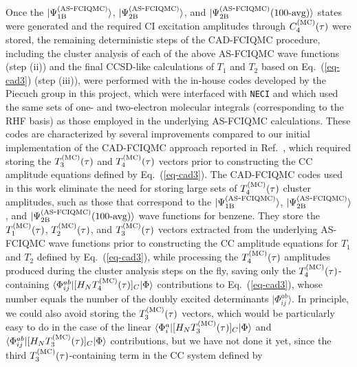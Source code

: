 \documentclass[journal=jcp,manuscript=suppinfo]{achemso}
\begin{document}
Once the $|\Psi_{\rm 1B}^{\rm (AS\mbox{-}FCIQMC)}\rangle$, $|\Psi_{\rm 2B}^{\rm (AS\mbox{-}FCIQMC)}\rangle$,
and $|\Psi_{\rm 2B}^{\rm (AS\mbox{-}FCIQMC)}\mbox{(100-avg)}\rangle$ states were generated and the
required CI excitation amplitudes through $C_{4}^{\rm (MC)}(\tau)$ were stored, the remaining
deterministic steps of the CAD-FCIQMC procedure, including the cluster analysis of each of the above
AS-FCIQMC wave functions (step (ii)) and the final CCSD-like calculations of $T_{1}$ and $T_{2}$ based on
Eq.\ (\ref{eq-cad3}) (step (iii)), were performed with the in-house codes developed by the Piecuch group in
this project, which were interfaced with {\texttt{NECI}} and which used the same sets of one- and two-electron
molecular integrals (corresponding to the RHF basis) as those employed in the underlying AS-FCIQMC calculations.
These codes are characterized by several improvements compared to our initial implementation of the CAD-FCIQMC
approach reported in Ref.\ , which required storing the
$T_{3}^{\rm (MC)}(\tau)$ and $T_{4}^{\rm (MC)}(\tau)$ vectors prior to constructing the CC amplitude
equations defined by Eq.\ (\ref{eq-cad3}). The CAD-FCIQMC codes used in this work eliminate the need for
storing large sets of $T_{4}^{\rm (MC)}(\tau)$ cluster amplitudes, such as those that correspond
to the $|\Psi_{\rm 1B}^{\rm (AS\mbox{-}FCIQMC)}\rangle$, $|\Psi_{\rm 2B}^{\rm (AS\mbox{-}FCIQMC)}\rangle$,
and $|\Psi_{\rm 2B}^{\rm (AS\mbox{-}FCIQMC)}\mbox{(100-avg)}\rangle$ wave functions for benzene. They
store the $T_{1}^{\rm (MC)}(\tau)$, $T_{2}^{\rm (MC)}(\tau)$, and $T_{3}^{\rm (MC)}(\tau)$ vectors
extracted from the underlying AS-FCIQMC wave functions prior to constructing the CC amplitude equations for
$T_{1}$ and $T_{2}$ defined by Eq.\ (\ref{eq-cad3}), while processing the $T_{4}^{\rm (MC)}(\tau)$
amplitudes produced during the cluster analysis steps on the fly, saving only the $T_{4}^{\rm (MC)}(\tau)$-containing
$\langle \Phi_{ij}^{ab} | [ H_N  T_{4}^{\rm (MC)}(\tau) ]_C | \Phi \rangle$ contributions to Eq.\ (\ref{eq-cad3}),
whose number equals the number of the doubly excited determinants $|\Phi_{ij}^{ab} \rangle$. In principle,
we could also avoid storing the $T_{3}^{\rm (MC)}(\tau)$ vectors, which would be particularly easy to do
in the case of the linear $\langle \Phi_{i}^{a} | [ H_N  T_{3}^{\rm (MC)}(\tau) ]_C | \Phi \rangle$ and
$\langle \Phi_{ij}^{ab} | [ H_N  T_{3}^{\rm (MC)}(\tau) ]_C | \Phi \rangle$ contributions, but we have not
done it yet, since the third $T_{3}^{\rm (MC)}(\tau)$-containing term in the CC system defined by
\end{document}
